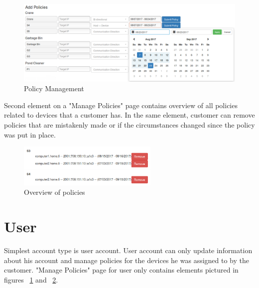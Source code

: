 \begin{figure}[ht]
	\begin{center}
		\includegraphics[width=\textwidth]{images/implementation/ManagePolicies}
		\caption{Policy Management}
		\label{fig:ManagePolicies}
	\end{center}
\end{figure}

Second element on a "Manage Policies" page contains overview of all policies related to devices that a customer has. In the same element, customer can remove policies that are mistakenly made or if the circumstances changed since the policy was put in place.

\begin{figure}[ht]
	\begin{center}
		\includegraphics[width=0.6\textwidth]{images/implementation/PolicyOverview}
		\caption{Overview of policies}
		\label{fig:PolicyOverview}
	\end{center}
\end{figure}

\section{User}

Simplest account type is user account. User account can only update information about his account and manage policies for the devices he was assigned to by the customer. "Manage Policies" page for user only contains elements pictured in figures ~\ref{fig:ManagePolicies} and ~\ref{fig:PolicyOverview}.




